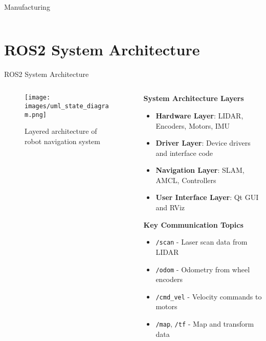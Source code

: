 \documentclass[aspectratio=169]{beamer}
\begin{document}
\begin{frame}{Manufacturing}
{\begin{columns}
			\hspace{-12em}

			\begin{column}{0.45\textwidth}
				\centering
        \setlength{\fboxrule}{1.2pt}
			\end{column}
		\end{columns}
	}
\end{frame}

\section{ROS2 System Architecture}

\begin{frame}{ROS2 System Architecture}
	\begin{columns}
		\begin{column}{0.5\textwidth}
			\begin{figure}
				\centering
				\texttt{[image: images/uml\_state\_diagram.png]} %
				\caption{Layered architecture of robot navigation system}
			\end{figure}
		\end{column}
		\begin{column}{0.5\textwidth}
			\textbf{System Architecture Layers}
			\begin{itemize}
				\item \textbf{Hardware Layer}: LIDAR, Encoders, Motors, IMU
				\item \textbf{Driver Layer}: Device drivers and interface code
				\item \textbf{Navigation Layer}: SLAM, AMCL, Controllers
				\item \textbf{User Interface Layer}: Qt GUI and RViz
			\end{itemize}
			\vspace{0.5cm}
			\textbf{Key Communication Topics}
			\begin{itemize}
				\item \texttt{/scan} - Laser scan data from LIDAR
				\item \texttt{/odom} - Odometry from wheel encoders
				\item \texttt{/cmd\_vel} - Velocity commands to motors
				\item \texttt{/map}, \texttt{/tf} - Map and transform data
			\end{itemize}
		\end{column}
	\end{columns}
\end{frame}
\end{document}
